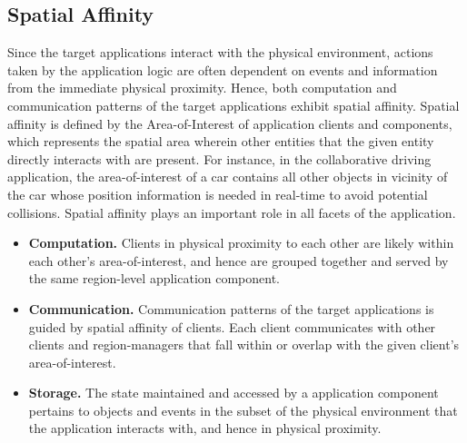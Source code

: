 \subsection{Spatial Affinity}
\label{sec:spatial_affinity}
Since the target applications interact with the physical environment, actions taken by the application logic are often dependent on events and information from the immediate physical proximity. Hence, both computation and communication patterns of the target applications exhibit spatial affinity. Spatial affinity is defined by the Area-of-Interest of application clients and components, which represents the spatial area wherein other entities that the given entity directly interacts with are present. For instance, in the collaborative driving application, the area-of-interest of a car contains all other objects in vicinity of the car whose position information is needed in real-time to avoid potential collisions. Spatial affinity plays an important role in all facets of the application.
\begin{itemize}
\item \textbf{Computation. }Clients in physical proximity to each other are likely within each other's area-of-interest, and hence are grouped together and served by the same region-level application component. 
\item \textbf{Communication. } Communication patterns of the target applications is guided by spatial affinity of clients. Each client communicates with other clients and region-managers that fall within or overlap with the given client's area-of-interest. 
\item \textbf{Storage. }The state maintained and accessed by a application component pertains to objects and events in the subset of the physical environment that the application interacts with, and hence in physical proximity.
\end{itemize}

